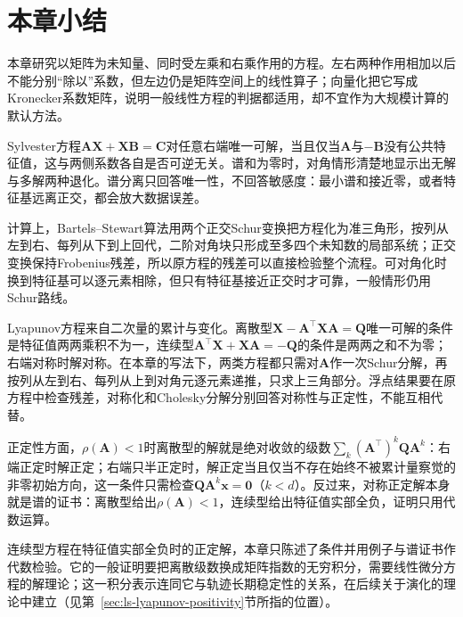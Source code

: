 \FloatBarrier
\section{本章小结}
\label{sec:matrix-equations-chapter-summary}

本章研究以矩阵为未知量、同时受左乘和右乘作用的方程。左右两种作用相加以后不能分别“除以”系数，但左边仍是矩阵空间上的线性算子；向量化把它写成Kronecker系数矩阵，说明一般线性方程的判据都适用，却不宜作为大规模计算的默认方法。

Sylvester方程$\bm A\bm X+\bm X\bm B=\bm C$对任意右端唯一可解，当且仅当$\bm A$与$-\bm B$没有公共特征值，这与两侧系数各自是否可逆无关。谱和为零时，对角情形清楚地显示出无解与多解两种退化。谱分离只回答唯一性，不回答敏感度：最小谱和接近零，或者特征基远离正交，都会放大数据误差。

计算上，Bartels--Stewart算法用两个正交Schur变换把方程化为准三角形，按列从左到右、每列从下到上回代，二阶对角块只形成至多四个未知数的局部系统；正交变换保持Frobenius残差，所以原方程的残差可以直接检验整个流程。可对角化时换到特征基可以逐元素相除，但只有特征基接近正交时才可靠，一般情形仍用Schur路线。

Lyapunov方程来自二次量的累计与变化。离散型$\bm X-\bm A^\top\bm X\bm A=\bm Q$唯一可解的条件是特征值两两乘积不为一，连续型$\bm A^\top\bm X+\bm X\bm A=-\bm Q$的条件是两两之和不为零；右端对称时解对称。在本章的写法下，两类方程都只需对$\bm A$作一次Schur分解，再按列从左到右、每列从上到对角元逐元素递推，只求上三角部分。浮点结果要在原方程中检查残差，对称化和Cholesky分解分别回答对称性与正定性，不能互相代替。

正定性方面，$\rho(\bm A)<1$时离散型的解就是绝对收敛的级数$\sum_k(\bm A^\top)^k\bm Q\bm A^k$：右端正定时解正定；右端只半正定时，解正定当且仅当不存在始终不被累计量察觉的非零初始方向，这一条件只需检查$\bm Q\bm A^k\bm x=\bm0$（$k<d$）。反过来，对称正定解本身就是谱的证书：离散型给出$\rho(\bm A)<1$，连续型给出特征值实部全负，证明只用代数运算。

连续型方程在特征值实部全负时的正定解，本章只陈述了条件并用例子与谱证书作代数检验。它的一般证明要把离散级数换成矩阵指数的无穷积分，需要线性微分方程的解理论；这一积分表示连同它与轨迹长期稳定性的关系，在后续关于演化的理论中建立（见第~\ref{sec:ls-lyapunov-positivity}节所指的位置）。

